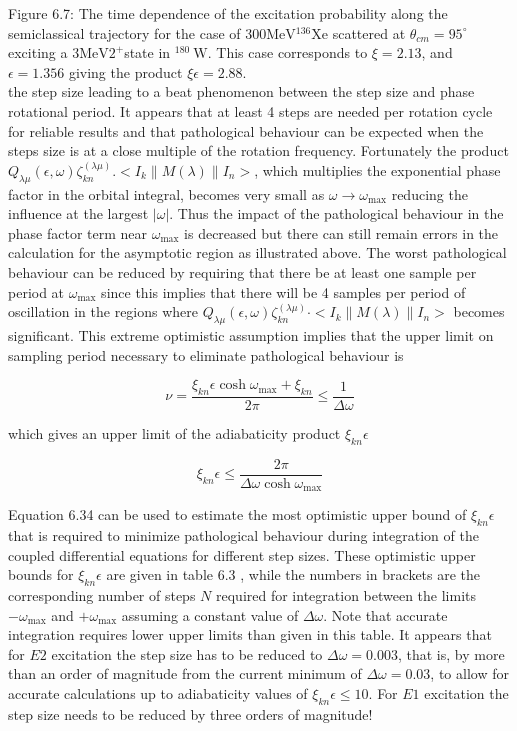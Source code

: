\documentclass[10pt]{article}
\begin{document}
Figure 6.7: The time dependence of the excitation probability along the semiclassical trajectory for the case of $300 \mathrm{MeV}{ }^{136} \mathrm{Xe}$ scattered at $\theta_{c m}=95^{\circ}$ exciting a $3 \mathrm{MeV} 2^{+}$state in ${ }^{180} \mathrm{~W}$. This case corresponds to $\xi=2.13$, and $\epsilon=1.356$ giving the product $\xi \epsilon=2.88$.\\
the step size leading to a beat phenomenon between the step size and phase rotational period. It appears that at least 4 steps are needed per rotation cycle for reliable results and that pathological behaviour can be expected when the steps size is at a close multiple of the rotation frequency. Fortunately the product $Q_{\lambda \mu}(\epsilon, \omega) \zeta_{k n}^{(\lambda \mu)} .<I_{k}\|M(\lambda)\| I_{n}>$, which multiplies the exponential phase factor in the orbital integral, becomes very small as $\omega \rightarrow \omega_{\max }$ reducing the influence at the largest $|\omega|$. Thus the impact of the pathological behaviour in the phase factor term near $\omega_{\max }$ is decreased but there can still remain errors in the calculation for the asymptotic region as illustrated above. The worst pathological behaviour can be reduced by requiring that there be at least one sample per period at $\omega_{\max }$ since this implies that there will be 4 samples per period of oscillation in the regions where $Q_{\lambda \mu}(\epsilon, \omega) \zeta_{k n}^{(\lambda \mu)} \cdot<I_{k}\|M(\lambda)\| I_{n}>$ becomes significant. This extreme optimistic assumption implies that the upper limit on sampling period necessary to eliminate pathological behaviour is


\begin{equation*}
\nu=\frac{\xi_{k n} \epsilon \cosh \omega_{\max }+\xi_{k n}}{2 \pi} \leq \frac{1}{\Delta \omega} \tag{6.33}
\end{equation*}


which gives an upper limit of the adiabaticity product $\xi_{k n} \epsilon$


\begin{equation*}
\xi_{k n} \epsilon \leq \frac{2 \pi}{\Delta \omega \cosh \omega_{\max }} \tag{6.34}
\end{equation*}


Equation 6.34 can be used to estimate the most optimistic upper bound of $\xi_{k n} \epsilon$ that is required to minimize pathological behaviour during integration of the coupled differential equations for different step sizes. These optimistic upper bounds for $\xi_{k n} \epsilon$ are given in table 6.3 , while the numbers in brackets are the corresponding number of steps $N$ required for integration between the limits $-\omega_{\max }$ and $+\omega_{\max }$ assuming a constant value of $\Delta \omega$. Note that accurate integration requires lower upper limits than given in this table. It appears that for $E 2$ excitation the step size has to be reduced to $\Delta \omega=0.003$, that is, by more than an order of magnitude from the current minimum of $\Delta \omega=0.03$, to allow for accurate calculations up to adiabaticity values of $\xi_{k n} \epsilon \leq 10$. For $E 1$ excitation the step size needs to be reduced by three orders of magnitude!
\end{document}
